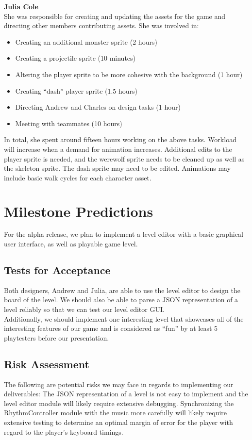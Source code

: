 \documentclass[]{article}
\begin{document}
\textbf{Julia Cole} \\
She was responsible for creating and updating the assets for the 
game and directing other members contributing assets. She was involved in:
\begin{itemize}
\item Creating an additional monster sprite (2 hours)
\item Creating a projectile sprite (10 minutes)
\item Altering the player sprite to be more cohesive with the 
  background (1 hour)
\item Creating ``dash'' player sprite (1.5 hours)
\item Directing Andrew and Charles on design tasks (1 hour)
\item Meeting with teammates (10 hours)
\end{itemize}
In total, she spent around fifteen hours working on the above
tasks. Workload will increase when a demand for animation
increases. Additional edits to the player sprite is needed, and the
werewolf sprite needs to be cleaned up as well as the skeleton
sprite. The dash sprite may need to be edited. Animations may include
basic walk cycles for each character asset. \\

\section*{Milestone Predictions}
For the alpha release, we plan to implement a level editor with a 
basic graphical user interface, as well as playable game level.
\subsection*{Tests for Acceptance}
Both designers, Andrew and Julia, are able to use the level editor to
design the board of the level. We should also be able to parse a JSON
representation of a level reliably so that we can test our level
editor GUI.\\

Additionally, we should implement one interesting level that showcases
all of the interesting features of our game and is considered as ``fun''
by at least 5 playtesters before our presentation.

\subsection*{Risk Assessment}
The following are potential risks we may face in regards to 
implementing our deliverables:
The JSON representation of a level is not easy to implement and the 
level editor module will likely require extensive debugging.
Synchronizing the RhythmController module with the music more carefully 
will likely require extensive testing to determine an optimal margin 
of error for the player with regard to the player's keyboard timings.
\end{document}
